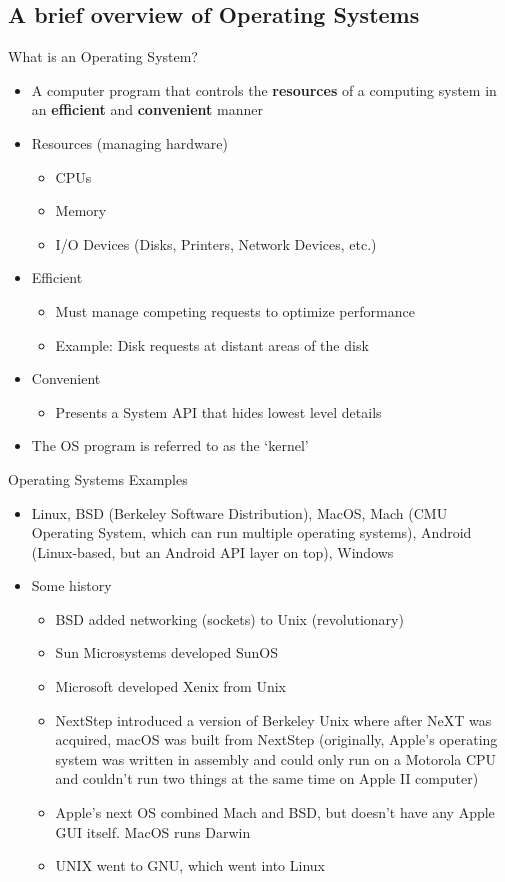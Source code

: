 \subsection{A brief overview of Operating Systems}

What is an Operating System?
\begin{itemize}
    \item A computer program that controls the \textbf{resources} of a computing system in an \textbf{efficient} and \textbf{convenient} manner
    \item Resources (managing hardware)
    \begin{itemize}
        \item CPUs
        \item Memory
        \item I/O Devices (Disks, Printers, Network Devices, etc.)
    \end{itemize}
    \item Efficient
    \begin{itemize}
        \item Must manage competing requests to optimize performance
        \item Example: Disk requests at distant areas of the disk
    \end{itemize}
    \item Convenient
    \begin{itemize}
        \item Presents a System API that hides lowest level details
    \end{itemize}
    \item The OS program is referred to as the `kernel'
\end{itemize}
Operating Systems Examples
\begin{itemize}
    \item Linux, BSD (Berkeley Software Distribution), MacOS, Mach (CMU Operating System, which can run multiple operating systems), Android (Linux-based, but an Android API layer on top), Windows
    \item Some history
    \begin{itemize}
        \item BSD added networking (sockets) to Unix (revolutionary)
        \item Sun Microsystems developed SunOS
        \item Microsoft developed Xenix from Unix
        \item NextStep introduced a version of Berkeley Unix where after NeXT was acquired, macOS was built from NextStep (originally, Apple's operating system was written in assembly and could only run on a Motorola CPU and couldn't run two things at the same time on Apple II computer)
        \item Apple's next OS combined Mach and BSD, but doesn't have any Apple GUI itself. MacOS runs Darwin
        \item UNIX went to GNU, which went into Linux
    \end{itemize}
\end{itemize}
